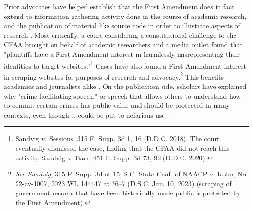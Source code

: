 Prior advocates have helped establish that the First Amendment does in fact extend to information gathering activity done in the course of academic research, and the publication of material like source code in order to illustrate aspects of research \cite{parkResearchersGuideLegal}. Most critically, a court considering a constitutional challenge to the CFAA brought on behalf of academic researchers and a media outlet found that "plaintiffs have a First Amendment interest in harmlessly misrepresenting their identities to target websites."\footnote{Sandvig v. Sessions, 315 F. Supp. 3d 1, 16 (D.D.C. 2018). The court eventually dismissed the case, finding that the CFAA did not reach this activity. Sandvig v. Barr, 451 F. Supp. 3d 73, 92 (D.D.C. 2020).} Cases have also found a First Amendment interest in scraping websites for purposes of research and advocacy.\footnote{\textit{See Sandvig}, 315 F. Supp. 3d at 15; S.C. State Conf. of NAACP v. Kohn, No. 22-cv-1007, 2023 WL 144447 at *6–7 (D.S.C. Jan. 10, 2023) (scraping of government records that have been historically made public is protected by the First Amendment).} This benefits academics and journalists alike \cite{baranetsky2018}. On the publication side, scholars have explained why "crime-facilitating speech," or speech that allows others to understand how to commit certain crimes has public value and should be protected in many contexts, even though it could be put to nefarious use \cite{volokhCrimeFacilitatingSpeech2005, matwyshyn2013}. 

